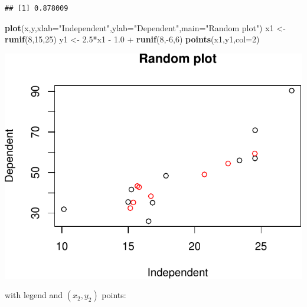 \documentclass[]{article}
\newenvironment{Shaded}{\begin{snugshade}}{\end{snugshade}}
\newcommand{\KeywordTok}[1]{\textcolor[rgb]{0.13,0.29,0.53}{\textbf{{#1}}}}
\newcommand{\DataTypeTok}[1]{\textcolor[rgb]{0.13,0.29,0.53}{{#1}}}
\newcommand{\DecValTok}[1]{\textcolor[rgb]{0.00,0.00,0.81}{{#1}}}
\newcommand{\FloatTok}[1]{\textcolor[rgb]{0.00,0.00,0.81}{{#1}}}
\newcommand{\StringTok}[1]{\textcolor[rgb]{0.31,0.60,0.02}{{#1}}}
\newcommand{\NormalTok}[1]{{#1}}
\numberwithin{equation}{section}
\begin{document}
\begin{verbatim}
## [1] 0.878009
\end{verbatim}

\begin{Shaded}
\begin{Highlighting}[]
 \KeywordTok{plot}\NormalTok{(x,y,}\DataTypeTok{xlab=}\StringTok{"Independent"}\NormalTok{,}\DataTypeTok{ylab=}\StringTok{"Dependent"}\NormalTok{,}\DataTypeTok{main=}\StringTok{"Random plot"}\NormalTok{)}
 \NormalTok{x1 <-}\StringTok{ }\KeywordTok{runif}\NormalTok{(}\DecValTok{8}\NormalTok{,}\DecValTok{15}\NormalTok{,}\DecValTok{25}\NormalTok{)}
 \NormalTok{y1 <-}\StringTok{ }\FloatTok{2.5}\NormalTok{*x1 -}\StringTok{ }\FloatTok{1.0} \NormalTok{+}\StringTok{ }\KeywordTok{runif}\NormalTok{(}\DecValTok{8}\NormalTok{,-}\DecValTok{6}\NormalTok{,}\DecValTok{6}\NormalTok{)}
 \KeywordTok{points}\NormalTok{(x1,y1,}\DataTypeTok{col=}\DecValTok{2}\NormalTok{)}
\end{Highlighting}
\end{Shaded}

\includegraphics{index_files/figure-latex/unnamed-chunk-78-1.pdf}

with legend and \((x_2,y_2)\) points:
\end{document}
